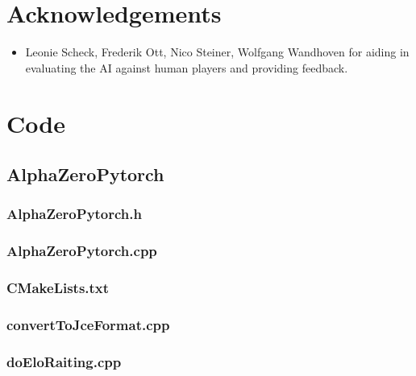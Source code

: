 \documentclass[12pt]{article}
\newcommand{\incFile}[2]{\label{code:#2}}
\begin{document}



\section*{Acknowledgements}
\begin{itemize}
\item Leonie Scheck, Frederik Ott, Nico Steiner, Wolfgang Wandhoven for aiding in evaluating the AI against human players and providing feedback.
\end{itemize}

\section{Code}
\subsection{AlphaZeroPytorch}
\subsubsection{AlphaZeroPytorch.h}							\incFile{C++}{AlphaZeroPytorch/AlphaZeroPytorch.h}
\subsubsection{AlphaZeroPytorch.cpp}						\incFile{C++}{AlphaZeroPytorch/AlphaZeroPytorch.cpp}
\subsubsection{CMakeLists.txt}										\incFile{python}{AlphaZeroPytorch/CMakeLists.txt}
\subsubsection{convertToJceFormat.cpp}					\incFile{C++}{AlphaZeroPytorch/convertToJceFormat.cpp}
\subsubsection{doEloRaiting.cpp}									\incFile{C++}{AlphaZeroPytorch/doEloRaiting.cpp}
\end{document}
